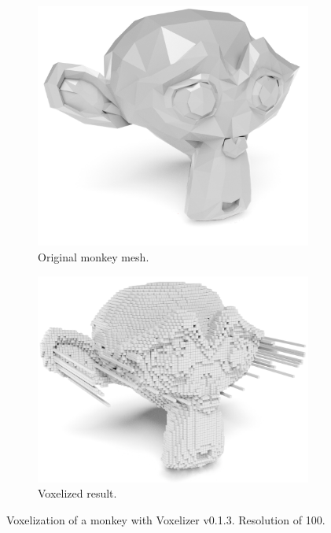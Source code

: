 \begin{figure}[h]
    \centering
    \begin{subfigure}[b]{0.46\textwidth}
        \centering
        \includegraphics[width=\textwidth]{sections/theory/figures/monkey.png}
        \caption{Original monkey mesh.}
        \label{fig:original-monkey}
    \end{subfigure}
    \hfill
    \begin{subfigure}[b]{0.53\textwidth}
        \centering
        \includegraphics[width=\textwidth]{sections/theory/figures/voxelizer-v013-monkey-100.png}
        \caption{Voxelized result.}
        \label{fig:voxelizer-v0.1.3-monkey}
    \end{subfigure}
    \caption{Voxelization of a monkey with Voxelizer v0.1.3. Resolution of 100.}
    \label{fig:voxelizer-v0.1.3-monkey}
\end{figure}
